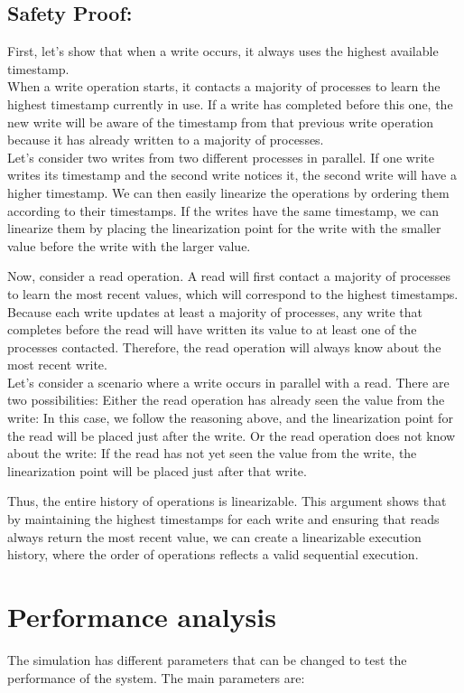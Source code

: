\documentclass{article}
\begin{document}
\subsection{Safety Proof:}
First, let’s show that when a write occurs, it always uses the highest available timestamp. \\ When a write operation starts, it contacts a majority of processes to learn the highest timestamp currently in use. If a write has completed before this one, the new write will be aware of the timestamp from that previous write operation because it has already written to a majority of processes.
\\Let’s consider two writes from two different processes in parallel. If one write writes its timestamp and the second write notices it, the second write will have a higher timestamp. We can then easily linearize the operations by ordering them according to their timestamps. If the writes have the same timestamp, we can linearize them by placing the linearization point for the write with the smaller value before the write with the larger value.

\vspace{10pt}Now, consider a read operation. A read will first contact a majority of processes to learn the most recent values, which will correspond to the highest timestamps. Because each write updates at least a majority of processes, any write that completes before the read will have written its value to at least one of the processes contacted. Therefore, the read operation will always know about the most recent write. \\Let's consider a scenario where a write occurs in parallel with a read. There are two possibilities:
Either the read operation has already seen the value from the write: In this case, we follow the reasoning above, and the linearization point for the read will be placed just after the write.
Or the read operation does not know about the write: If the read has not yet seen the value from the write, the linearization point will be placed just after that write.

\vspace{10pt}Thus, the entire history of operations is linearizable. This argument shows that by maintaining the highest timestamps for each write and ensuring that reads always return the most recent value, we can create a linearizable execution history, where the order of operations reflects a valid sequential execution.

\newpage
\section{Performance analysis}
The simulation has different parameters that can be changed to test the performance of the system. The main parameters are:
\end{document}
